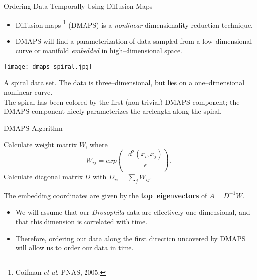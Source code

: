 \begin{frame}{Ordering Data Temporally Using Diffusion Maps}

\begin{itemize}
\item Diffusion maps \footnote{ \tiny Coifman {\em et al}, PNAS, 2005.} (DMAPS) is a {\em nonlinear} dimensionality reduction technique.
\item DMAPS will find a parameterization of data sampled from a low--dimensional curve or manifold {\em embedded} in high--dimensional space.
\end{itemize}

	\begin{minipage}{0.4\textwidth}
		\texttt{[image: dmaps\_spiral.jpg]}\\
		\centering
		{\scriptsize A spiral data set. The data is three--dimensional, but lies on a one--dimensional nonlinear curve. \\
		The spiral has been colored by the first (non-trivial) DMAPS component; the DMAPS component nicely parameterizes the arclength along the spiral. \par}
	\end{minipage}
	\begin{minipage}{0.5\textwidth}
		\begin{block}{DMAPS Algorithm}
		{\scriptsize 
		Calculate weight matrix $W$, where
		$$W_{ij} = exp\left( -\frac{d^2(x_i, x_j)}{\epsilon} \right).$$
		Calculate diagonal matrix $D$ with $D_{ii} = \sum_j W_{ij}.$
		
		The embedding coordinates are given by the {\bf top~eigenvectors} of $A=D^{-1}W$.
		\par}
	\end{block}
	\end{minipage}

\vspace{0.1in}


\begin{itemize}
\item We will assume that our {\em Drosophila} data are effectively one-dimensional, and that this dimension is correlated with time. 
%
\item Therefore, ordering our data along the first direction uncovered by DMAPS will allow us to order our data in time. 
\end{itemize}

\end{frame}

